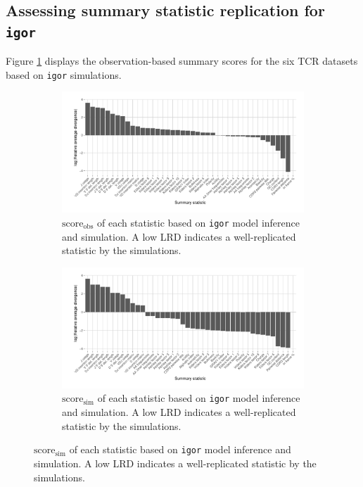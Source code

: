 \documentclass{article}
\begin{document}
\subsection*{Assessing summary statistic replication for \texttt{igor}}
Figure \ref{fig:ObsScoresTCR} displays the observation-based summary scores for the six TCR datasets based on \texttt{igor} simulations.
\begin{figure}
	\begin{subfigure}{\textwidth}
    	\includegraphics[width=\linewidth]{Figures/IgorScores/obs_score_plot.pdf}
    	\caption{$\text{score}_\text{obs}$ of each statistic based on \texttt{igor} model inference and simulation.
        	A low LRD indicates a well-replicated statistic by the simulations.
    	}
    	\label{fig:ObsScoresTCR}
	\end{subfigure}
	\begin{subfigure}{\textwidth}
    	\includegraphics[width=\linewidth]{Figures/IgorScores/sim_score_plot.pdf}
    	\caption{$\text{score}_\text{sim}$ of each statistic based on \texttt{igor} model inference and simulation.
    	    A low LRD indicates a well-replicated statistic by the simulations.
    	}
    	\label{fig:SimScoresTCR}
	\end{subfigure}
\end{figure}
\end{document}
